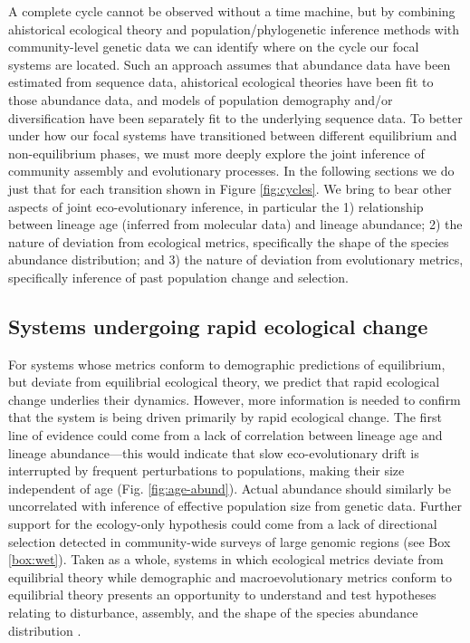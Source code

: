 \documentclass[12pt]{article}
\newcounter{Box}
\begin{document}
A complete cycle cannot be observed without a time machine, but by
combining ahistorical ecological theory and population/phylogenetic
inference methods with community-level genetic data we can identify
where on the cycle our focal systems are located. Such an approach
assumes that abundance data have been estimated from sequence data,
ahistorical ecological theories have been fit to those abundance data,
and models of population demography and/or diversification have been
separately fit to the underlying sequence data. To better under how
our focal systems have transitioned between different equilibrium and
non-equilibrium phases, we must more deeply explore the joint
inference of community assembly and evolutionary processes. In the
following sections we do just that for each transition shown in Figure
\ref{fig:cycles}. We bring to bear other aspects of joint
eco-evolutionary inference, in particular the 1) relationship between
lineage age (inferred from molecular data) and lineage abundance; 2)
the nature of deviation from ecological metrics, specifically the
shape of the species abundance distribution; and 3) the nature of
deviation from evolutionary metrics, specifically inference of past
population change and selection.

\subsection{Systems undergoing rapid ecological change}

For systems whose metrics conform to demographic predictions of
% 
% 
% 
% 
equilibrium, but deviate from equilibrial ecological theory, we
predict that rapid ecological change underlies their
dynamics. However, more information is needed to confirm that the
system is being driven primarily by rapid ecological change. The first
line of evidence could come from a lack of correlation between lineage
age and lineage abundance---this would indicate that slow
eco-evolutionary drift is interrupted by frequent perturbations to
populations, making their size independent of age
(Fig. \ref{fig:age-abund}). Actual abundance should similarly be
uncorrelated with inference of effective population size from genetic
data. Further support for the ecology-only hypothesis could come from
a lack of directional selection detected in community-wide surveys of
large genomic regions (see Box \ref{box:wet}). Taken as a
whole, systems in which ecological metrics deviate from equilibrial
theory while demographic and macroevolutionary metrics conform to
equilibrial theory presents an opportunity to understand and test
hypotheses relating to disturbance, assembly, and the shape of the
species abundance distribution \citep[e.g.,][]{Harte2011-um}.
\end{document}
